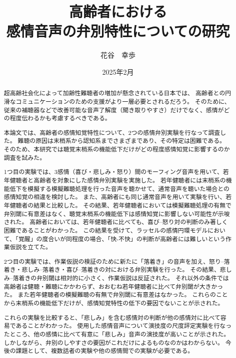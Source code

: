 \documentclass[11pt]{jreport}
\title{高齢者における\\感情音声の弁別特性についての研究}
\author{花谷　幸歩}
\date{2025年2月}	%
\begin{document}
\maketitle



\begin{abstract}
超高齢社会化によって加齢性難聴者の増加が懸念されている日本では、
高齢者との円滑なコミュニケーションのための支援がより一層必要とされるだろう。
そのために、従来の補聴器などで改善可能な音声了解度（聞き取りやすさ）だけでなく、感情がどの程度伝わるかも考慮するべきである。

本論文では、高齢者の感情知覚特性について、2つの感情弁別実験を行なって調査した。
難聴の原因は末梢系から認知系までさまざまであり、その特定は困難である。
そのため、本研究では聴覚末梢系の機能低下だけがどの程度感情知覚に影響するのか調査を試みた。

1つ目の実験では、3感情（喜び・悲しみ・怒り）間のモーフィング音声を用いて、若年健聴者と高齢者を対象にした感情弁別実験を実施した。
若年健聴者には末梢系の機能低下を模擬する模擬難聴処理を行った音声を聴かせて、通常音声を聴いた場合との感情知覚の相違を検討した。
また、高齢者にも同じ通常音声を用いて実験を行い、若年健聴者の結果と比較した。
その結果、若年健聴者においては模擬難聴処理の有無で弁別閾に有意差はなく、聴覚末梢系の機能低下は感情知覚に影響しない可能性が示唆された。
高齢者においては、若年健聴者に比べても、喜び--怒り対の判断のみ著しく困難であることがわかった。
この結果を受けて、ラッセルの感情円環モデルにおいて、「覚醒」の度合いが同程度の場合、「快-不快」の判断が高齢者には難しいという作業仮説を立てた。

2つ目の実験では、作業仮説の検証のために新たに「落着き」の音声を加え、怒り--落着き・悲しみ--落着き・喜び--落着きの対における弁別実験を行った。
その結果、悲しみ--落着きの弁別閾は相対的に小さく、作業仮説は反証された。
それ以外の条件では高齢者は健聴・難聴にかかわらず、おおむね若年健聴者に比べて弁別閾が大きかった。 
また若年健聴者の模擬難聴の有無で弁別閾に有意差はなかった。
これらのことから末梢系の機能低下だけが、感情知覚特性の低下の要因でないことが示された。

これらの実験を比較すると、「悲しみ」を含む感情対の判断が他の感情対に比べて容易であることがわかった。
使用した感情音声について演技度の尺度評定実験を行なったところ、他の感情に比べて有意に「悲しみ」音声の演技度が高いことが示された。
しかしながら、弁別のしやすさの要因がこれだけによるものなのかはわからない。
今後の課題として、複数話者の実験や他の感情間での実験が必要である。




\end{abstract}
\end{document}
